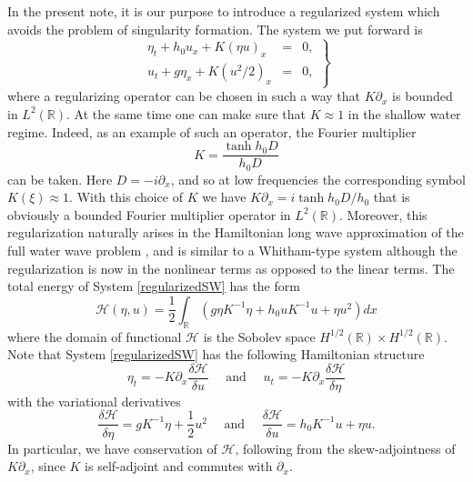 \documentclass[reqno,12pt,a4paper]{article}
\theoremstyle{plain}
\newcommand{\R}{\mathbb{R}}
\begin{document}
In the present note, it is our purpose to introduce a regularized
system which avoids the problem of singularity formation.
The system we put forward is
\begin{equation}
\label{regularizedSW}
	\left.
	\begin{array}{rcl}
		\eta_t + h_0 u_x  + K ( \eta u )_x
		& = &
		0
		, \\
		u_t + g \eta_x + K ( u^2/2 )_x
		& = &
		0
		,
	\end{array}
	\right\}
\end{equation}
where a regularizing operator can be chosen in
such a way that $K \partial_x$ is bounded in $L^2(\mathbb R)$.
At the same time one can make sure that $K \approx 1$
in the shallow water regime.
Indeed, as an example of such an operator,
the Fourier multiplier
\begin{equation}
\label{K_definition}
	K = \frac{ \tanh h_0D }{ h_0D }
\end{equation}
can be taken.
Here $D = -i\partial_x$,
and so at low frequencies the corresponding symbol $K(\xi) \approx 1$.
With this choice of $K$ we have 
$K \partial_x = i\tanh h_0D / h_0$ that is obviously
a bounded Fourier multiplier operator in $L^2(\mathbb R)$.
Moreover, this regularization naturally arises
in the Hamiltonian long wave approximation
of the full water wave problem \cite{Dinvay_Dutykh_Kalisch}, and
is similar to a Whitham-type system \cite{Aceves_Sanchez_Minzoni_Panayotaros, Moldabayev_Dutykh} although
the regularization is now in the nonlinear terms as opposed to the linear terms.
The total energy of System \eqref{regularizedSW} has the form
%
\begin{equation}
\label{Hamiltonian}
	\mathcal H(\eta, u)  = \frac 12 \int_\R
	\left(	
		g \eta K^{-1} \eta
		+ h_0 u K^{-1} u
		+ \eta u^2
	\right)
	dx
\end{equation}
%
where the domain of functional $\mathcal H$
is the Sobolev space $H^{1/2}(\mathbb R) \times H^{1/2}(\mathbb R)$.
Note that System \eqref{regularizedSW} has the following Hamiltonian structure
\begin{equation}
\label{Hamiltonian_structure}
    \eta_t
    =
    - K \partial_x
    \frac{\delta \mathcal H}{\delta u}
    \quad
    \text{ and }
    \quad
    u_t
    =
    - K \partial_x
    \frac{\delta \mathcal H}{\delta \eta}
\end{equation}
with the variational derivatives
\begin{equation}
\label{variational_derivatives}
    \frac{\delta \mathcal H}{\delta \eta}
    =
    g K^{-1} \eta
	+
    \frac 12 u^2
    \quad
    \text{ and }
    \quad
    \frac{\delta \mathcal H}{\delta u}
    =
    h_0 K^{-1} u
    +
    \eta u
    .
\end{equation}
In particular,
we have conservation of $\mathcal H$,
following from the skew-adjointness of $K \partial_x$,
since $K$ is self-adjoint and commutes with $\partial_x$.
\end{document}
